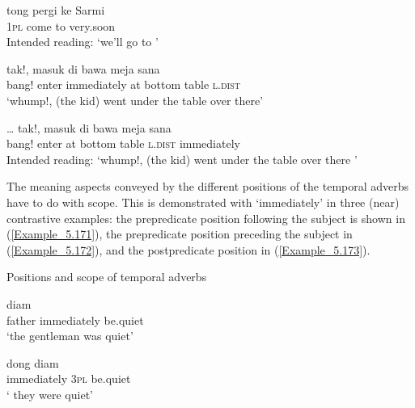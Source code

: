 \ea
\label{Example_5.168}
\gll {*} {tong} {pergi} {ke} {Sarmi} {}\\ %
  { }  \textsc{1pl}  come  to    very.soon\\
\glt 
Intended reading: ‘we’ll go to  ’ \textstyleExampleSource{[Elicited MY131113.002]}
\z

\ea
\label{Example_5.169}
\gll {{\ldots}} {tak!,} {masuk} {} {di} {bawa} {meja} {sana}\\ %
  { }    bang!  enter  immediately  at  bottom  table  \textsc{l.dist}\\
 ‘whump!,  (the kid) went under the table over there’ \textstyleExampleSource{[081025-009b-Cv.0029]}
\z

\ea
\label{Example_5.170}
 {{\ldots}} {tak!,} {masuk} {di} {bawa} {meja} {sana} {}\\ %
  { } { }    bang!  enter  at  bottom  table  \textsc{l.dist}  immediately\\
\glt 
Intended reading: ‘whump!, (the kid) went under the table over there ’ \textstyleExampleSource{[Elicited MY131113.003]}
\z


The meaning aspects conveyed by the different positions of the temporal adverbs have to do with scope. This is demonstrated with  ‘immediately’ in three (near) contrastive examples: the prepredicate position following the subject is shown in (\ref{Example_5.171}), the prepredicate position preceding the subject in (\ref{Example_5.172}), and the postpredicate position in (\ref{Example_5.173}).


\begin{styleExampleTitle}
Positions and scope of temporal adverbs
\end{styleExampleTitle}

\ea
\label{Example_5.171}
 {} {diam}\\ %
 father  immediately  be.quiet\\
\glt 
‘the gentleman was  quiet’ \textstyleExampleSource{[080917-010-CvEx.0186]}
\z

\ea
\label{Example_5.172}
 {dong} {diam}\\ %
 immediately  \textsc{3pl}  be.quiet\\
\glt 
‘ they were quiet’ \textstyleExampleSource{[080922-003-Cv.0085]}
\z

